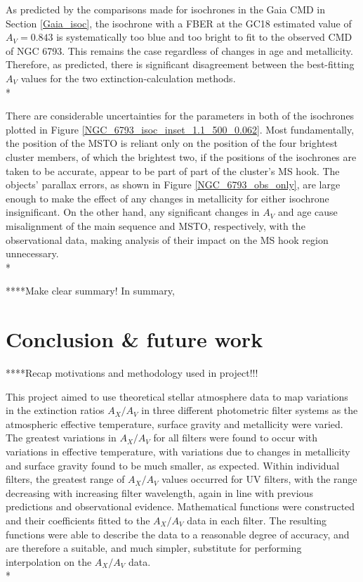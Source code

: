 \documentclass[12pt, a4paper]{report}
\begin{document}
As predicted by the comparisons made for isochrones in the Gaia CMD in Section \ref{Gaia_isoc}, the isochrone with a FBER at the GC18 estimated value of $A_{V} = 0.843$ is systematically too blue and too bright to fit to the observed CMD of NGC 6793. This remains the case regardless of changes in age and metallicity. Therefore, as predicted, there is significant disagreement between the best-fitting $A_{V}$ values for the two extinction-calculation methods.\\*

There are considerable uncertainties for the parameters in both of the isochrones plotted in Figure \ref{NGC_6793_isoc_inset_1.1_500_0.062}. Most fundamentally, the position of the MSTO is reliant only on the position of the four brightest cluster members, of which the brightest two, if the positions of the isochrones are taken to be accurate, appear to be part of part of the cluster's MS hook. The objects' parallax errors, as shown in Figure \ref{NGC_6793_obs_only}, are large enough to make the effect of any changes in metallicity for either isochrone insignificant. On the other hand, any significant changes in $A_{V}$ and age cause misalignment of the main sequence and MSTO, respectively, with the observational data, making analysis of their impact on the MS hook region unnecessary.\\*

****Make clear summary!
In summary,  

\chapter{Conclusion \& future work}
****Recap motivations and methodology used in project!!!

This project aimed to use theoretical stellar atmosphere data to map variations in the extinction ratios $A_{X}/A_{V}$ in three different photometric filter systems as the atmospheric effective temperature, surface gravity and metallicity were varied. The greatest variations in $A_{X}/A_{V}$ for all filters were found to occur with variations in effective temperature, with variations due to changes in metallicity and surface gravity found to be much smaller, as expected. Within individual filters, the greatest range of $A_{X}/A_{V}$ values occurred for UV filters, with the range decreasing with increasing filter wavelength, again in line with previous predictions and observational evidence. Mathematical functions were constructed and their coefficients fitted to the $A_{X}/A_{V}$ data in each filter. The resulting functions were able to describe the data to a reasonable degree of accuracy, and are therefore a suitable, and much simpler, substitute for performing interpolation on the $A_{X}/A_{V}$ data. \\* 
\end{document}
